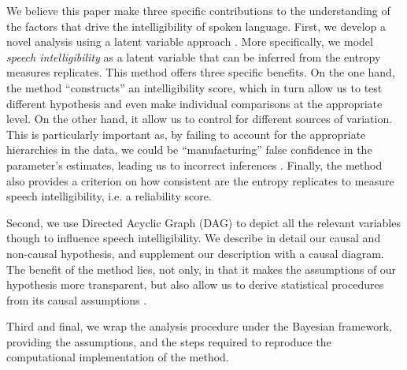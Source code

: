 We believe this paper make three specific contributions to the understanding of the factors that drive the intelligibility of spoken language. First, we develop a novel analysis using a latent variable approach \cite{Everitt_1984}. More specifically, we model \textit{speech intelligibility} as a latent variable that can be inferred from the entropy measures replicates. This method offers three specific benefits. On the one hand, the method ``constructs'' an intelligibility score, which in turn allow us to test different hypothesis and even make individual comparisons at the appropriate level. On the other hand, it allow us to control for different sources of variation. This is particularly important as, by failing to account for the appropriate hierarchies in the data, we could be ``manufacturing'' false confidence in the parameter's estimates, leading us to incorrect inferences \cite{McElreath_2020}. Finally, the method also provides a criterion on how consistent are the entropy replicates to measure speech intelligibility, i.e. a reliability score.

Second, we use Directed Acyclic Graph (DAG) \cite{Pearl_2009, Cinelli_et_al_2021} to depict all the relevant variables though to influence speech intelligibility. We describe in detail our causal and non-causal hypothesis, and supplement our description with a causal diagram. The benefit of the method lies, not only, in that it makes the assumptions of our hypothesis more transparent, but also allow us to derive statistical procedures from its causal assumptions \cite{McElreath_2020, Yarkoni_2020, Rohrer_et_al_2021}.

Third and final, we wrap the analysis procedure under the Bayesian framework, providing the assumptions, and the steps required to reproduce the computational implementation of the method.
%
%
